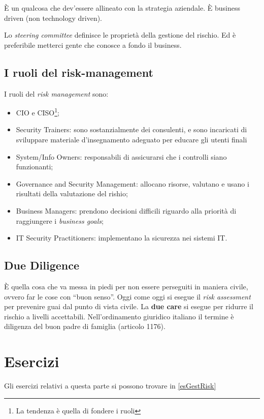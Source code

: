È un qualcosa che dev'essere allineato con la strategia aziendale.
È business driven (non technology driven).

Lo \textit{steering committee} definisce le proprietà della gestione del rischio.
Ed è preferibile metterci gente che conosce a fondo il business.

\subsection{I ruoli del risk-management}

I ruoli del \textit{risk management} sono:
\begin{itemize}
\item CIO e CISO\footnote{La tendenza è quella di fondere i ruoli};
\item Security Trainers: sono sostanzialmente dei consulenti, e sono incaricati
di sviluppare materiale d'insegnamento adeguato per educare gli utenti finali
\item System/Info Owners: responsabili di assicurarsi che i controlli siano
funzionanti;
\item Governance and Security Management: allocano risorse, valutano e usano i
risultati della valutazione del rishio;
\item Business Managers: prendono decisioni difficili riguardo alla priorità
di raggiungere i \textit{business goals};
\item IT Security Practitioners: implementano la sicurezza nei sistemi IT.
\end{itemize}

\subsection{Due Diligence}

È quella cosa che va messa in piedi per non essere perseguiti in maniera civile,
ovvero far le cose con ``buon senso''. Oggi come oggi si esegue il \textit{risk
assessment} per prevenire guai dal punto di vista civile. La \textbf{due care}
si esegue per ridurre il rischio a livelli accettabili. Nell'ordinamento
giuridico italiano il termine è diligenza del buon padre di famiglia (articolo
1176).


\section{Esercizi}

Gli esercizi relativi a questa parte si possono trovare in \ref{esGestRisk}
